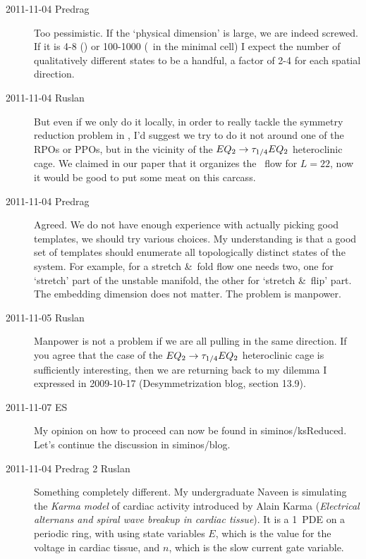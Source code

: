 \begin{description}
\item[2011-11-04 Predrag] Too pessimistic. If the `physical dimension' is
large, we are indeed screwed. If it is 4-8 (\KS) or 100-1000 (\pCf\ in
the minimal cell) I expect the number of qualitatively different states
to be a handful, a factor of 2-4 for each spatial direction.
%

\item[2011-11-04 Ruslan]
But even if we only do it locally, in order to really tackle the symmetry
reduction problem in \KS, I'd suggest we try to do it not around one of
the RPOs or PPOs, but in the vicinity of the $EQ_{2} \to
\tau_{1/4}EQ_{2}$ heteroclinic cage.  We claimed in our paper that it
organizes the \KS\ flow for $L = 22$, now it would be good to put some
meat on this carcass.

\item[2011-11-04 Predrag] Agreed. We do not have enough experience with
actually picking good templates, we should try various choices. My
understanding is that a good set of templates should enumerate all topologically
distinct states of the system. For example, for a stretch \&\ fold flow
one needs two, one for `stretch' part of the unstable manifold, the other
for `stretch \&\ flip' part. The embedding dimension does not matter.
The problem is manpower.

\item[2011-11-05 Ruslan] Manpower is not a problem if we are all pulling
in the same direction.  If you agree that the case of the
$EQ_{2} \to \tau_{1/4}EQ_{2}$ heteroclinic cage is sufficiently interesting,
then we are returning back to my dilemma
I expressed in 2009-10-17 (Desymmetrization blog, section 13.9).

\item[2011-11-07 ES] My opinion on how to proceed can now be found
in siminos/ksReduced. Let's continue the discussion in siminos/blog.

\item[2011-11-04 Predrag 2 Ruslan] Something completely different. My
undergraduate Naveen is simulating the \emph{Karma model} of cardiac
activity introduced by Alain Karma (\emph{Electrical alternans and spiral
wave breakup in cardiac tissue}). It is a 1\dmn\ PDE on a
periodic ring, with using state variables $E$, which is the value for the
voltage in cardiac tissue, and $n$, which is the slow current gate
variable.


\end{description}
